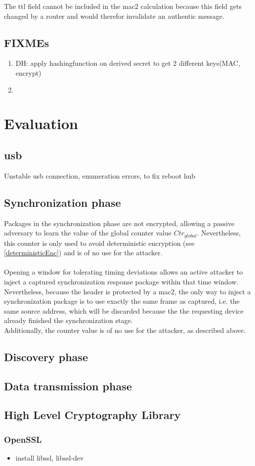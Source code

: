 The \gls{ttl} field cannot be included in the \gls{mac2} calculation because this field gets changed by a router and would therefor invalidate an authentic message.

\subsection{FIXMEs}

\begin{enumerate}
 \item DH: apply hashingfunction on derived secret to get 2 different keys(MAC, encrypt)
 \item 
\end{enumerate}



\section{Evaluation}

\subsection{\gls{usb}}
Unstable \gls{usb} connection, enumeration errors, to fix reboot hub

\subsection{Synchronization phase}
Packages in the synchronization phase are not encrypted, allowing a passive adversary to learn the value of the global counter value $Ctr_{global}$. Nevertheless,
this counter is only used to avoid deterministic encryption (see \ref{deterministicEnc}) and is of no use for the attacker.
\\
\\
Opening a window for tolerating timing deviations allows an active attacker to inject a captured synchronization response package within that time window.
Nevertheless, because the header is protected by a \gls{mac2}, the only way to inject a synchronization package is to use exactly the same frame as captured,
i.e. the same source address, which will be discarded because the the requesting device already finished the synchronization stage.
\\
Additionally, the counter value is of no use for the attacker, as described above.

\subsection{Discovery phase}

\subsection{Data transmission phase}


\subsection{High Level Cryptography Library}

\subsubsection{OpenSSL}

\begin{itemize}
 \item install libssl, libssl-dev
\end{itemize}

